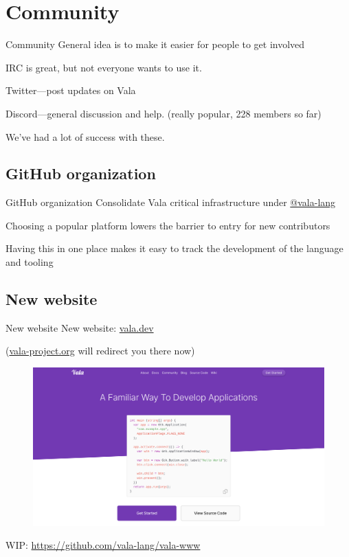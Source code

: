 \documentclass[t]{beamer}
\begin{document}
\section{Community}
\begin{frame}[c]{Community}
General idea is to make it easier for people to get involved

IRC is great, but not everyone wants to use it.

Twitter---post updates on Vala

Discord---general discussion and help. (really popular, 228 members so far)

We've had a lot of success with these.
\end{frame}

\subsection{GitHub organization}
\begin{frame}[c]{GitHub organization}
Consolidate Vala critical infrastructure under \href{https://github.com/vala-lang}{@vala-lang}

Choosing a popular platform lowers the barrier to entry for new contributors

Having this in one place makes it easy to track the development of the language and tooling
\end{frame}

\subsection{New website}
\begin{frame}[c]{New website}
New website: \href{https://vala.dev}{vala.dev}

{\small (\href{https://vala-project.org}{vala-project.org} will redirect you there now)}

\begin{figure}
    \begin{center}
        \includegraphics[scale=.09]{res/vala-website.png}
    \end{center}
\end{figure}

{\small WIP: \url{https://github.com/vala-lang/vala-www}}
\end{frame}
\end{document}
